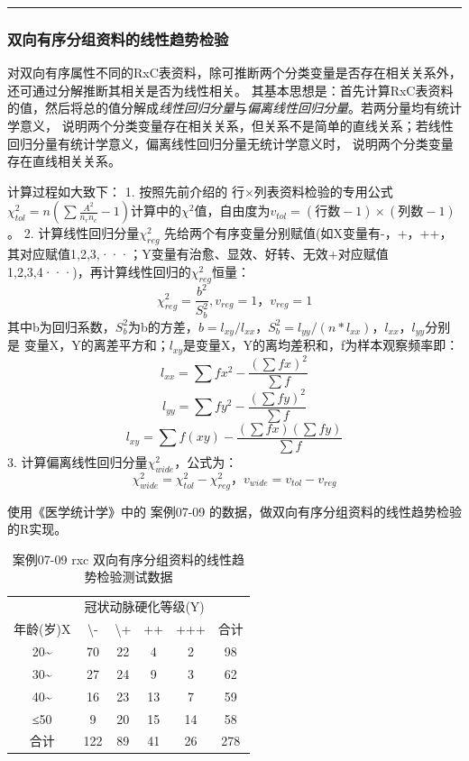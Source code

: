 \documentclass[
]{article}
\begin{document}
\begin{center}\rule{0.5\linewidth}{0.5pt}\end{center}

\hypertarget{ux53ccux5411ux6709ux5e8fux5206ux7ec4ux8d44ux6599ux7684ux7ebfux6027ux8d8bux52bfux68c0ux9a8c}{%
\subsubsection{双向有序分组资料的线性趋势检验}\label{ux53ccux5411ux6709ux5e8fux5206ux7ec4ux8d44ux6599ux7684ux7ebfux6027ux8d8bux52bfux68c0ux9a8c}}

对双向有序属性不同的RxC表资料，除可推断两个分类变量是否存在相关关系外，还可通过分解推断其相关是否为线性相关。
其基本思想是：首先计算RxC表资料的值，然后将总的值分解成\emph{线性回归分量}与\emph{偏离线性回归分量}。若两分量均有统计学意义，
说明两个分类变量存在相关关系，但关系不是简单的直线关系；若线性回归分量有统计学意义，偏离线性回归分量无统计学意义时，
说明两个分类变量存在直线相关关系。

计算过程如大致下：
1. 按照先前介绍的 行×列表资料检验的专用公式 \(\chi_{tol}^2=n(\sum\frac{A^2}{n_{r}n_{c}}-1)\)计算中的\(\chi^2\)值，自由度为\(v_{tol}=(行数-1)\times(列数-1)\)。
2. 计算线性回归分量\(\chi_{reg}^2\) 先给两个有序变量分别赋值(如X变量有-，+，++，其对应赋值1,2,3,···；Y变量有治愈、显效、好转、无效+对应赋值1,2,3,4···)，再计算线性回归的\(\chi_{reg}^2\)恒量：
\[\chi_{reg}^2=\frac{b^2}{S_b^2}, v_{reg}=1，v_{reg}=1\]
其中b为回归系数，\(S_b^2\)为b的方差，\(b=l_{xy}/l_{xx}\)，\(S_b^2=l_{yy}/(n*l_{xx})\)，\(l_{xx}，l_{yy}\)分别是
变量X，Y的离差平方和；\(l_{xy}\)是变量X，Y的离均差积和，f为样本观察频率即：
\[l_{xx}=\sum fx^2-\frac{(\sum fx)^2}{\sum f}\]
\[l_{yy}=\sum fy^2-\frac{(\sum fy)^2}{\sum f}\]
\[l_{xy}=\sum f(xy)-\frac{(\sum fx)(\sum fy)}{\sum f}\]
3. 计算偏离线性回归分量\(\chi_{wide}^2\)，公式为：
\[\chi_{wide}^2=\chi_{tol}^2-\chi_{reg}^2，v_{wide}=v_{tol}-v_{reg}\]

使用《医学统计学》中的 案例07-09 的数据，做双向有序分组资料的线性趋势检验的R实现。

\begin{table}

\caption{\label{tab:chisqtab7}案例07-09 rxc 双向有序分组资料的线性趋势检验测试数据}
\centering
\begin{tabular}[t]{cccccc}
\toprule
\multicolumn{1}{c}{ } & \multicolumn{4}{c}{冠状动脉硬化等级(Y)} & \multicolumn{1}{c}{ } \\
\cmidrule(l{3pt}r{3pt}){2-5}
年龄(岁)X & \textbackslash{}- & \textbackslash{}+ & ++ & +++ & 合计\\
\midrule
20\textasciitilde{} & 70 & 22 & 4 & 2 & 98\\
30\textasciitilde{} & 27 & 24 & 9 & 3 & 62\\
40\textasciitilde{} & 16 & 23 & 13 & 7 & 59\\
≤50 & 9 & 20 & 15 & 14 & 58\\
合计 & 122 & 89 & 41 & 26 & 278\\
\bottomrule
\end{tabular}
\end{table}
\end{document}

